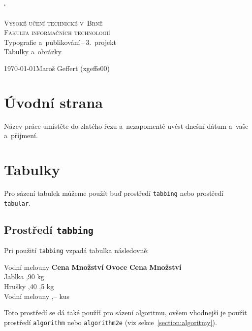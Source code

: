 \documentclass[11pt, a4paper]{article}
\begin{document}
    \catcode`

    \begin{titlepage}
        \begin{center}
            {\Huge \textsc{Vysoké učení technické v~Brně}} \\
            {\huge \textsc
                {Fakulta informačních technologií}}\\
            
            \LARGE
            {Typografie a~publikování\,--\,3.~projekt} \\
            \Huge{
            Tabulky a~obrázky}\\
    \end{center}

    {\Large {\today \hfill Maroš Geffert (xgeffe00)}}
\end{titlepage}


\section{Úvodní strana}
Název práce umístěte do zlatého řezu a~nezapomentě uvést dnešní dátum a~vaše a~příjmení.


\section{Tabulky}
Pro sázení tabulek můžeme použít buď prostředí \texttt{tabbing} nebo prostředí \texttt{tabular}.

\subsection{Prostředí \texttt{tabbing}}
Pri použití \texttt{tabbing} vzpadá tabulka následovně:

	\begin{tabbing}
		Vodní melouny   \quad\= \textbf{Cena} \quad\= \textbf{Množství}	    \kill
		\textbf{Ovoce}		\> \textbf{Cena}		\> \textbf{Množství}	\\
		Jablka				,90				 kg					\\
		Hrušky				,40				,5 kg				\\
		Vodní melouny		,--				 kus				\\
	\end{tabbing}
Toto prostředí se dá také použíť pro sázení algoritmu, ovšem vhodnejší je použít prostředí \texttt{algorithm} nebo \texttt{algorithm2e} (viz sekce~\ref{section:algoritmy}).
\end{document}
